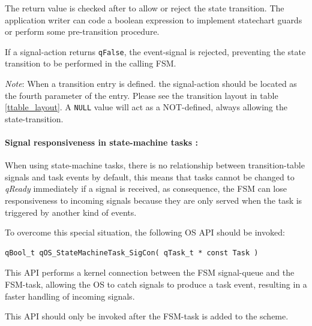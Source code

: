 \documentclass{article}
\begin{document}
\newline

The return value is checked after to allow or reject the state transition. The application writer can code a boolean expression to implement statechart guards or perform some pre-transition procedure.

\begin{tcolorbox}
\HandRight If a signal-action returns \lstinline{qFalse}, the event-signal is rejected, preventing the state transition to be performed in the calling FSM.
\end{tcolorbox}

\begin{tcolorbox}
\ArrowBoldDownRight \textit{Note}: When a transition entry is defined. the signal-action should be located as the fourth parameter of the entry. Please see the transition layout in table \ref{ttable_layout}.
A \lstinline{NULL} value will act as a NOT-defined, always allowing the state-transition. 
\end{tcolorbox}

\paragraph{Signal responsiveness in state-machine tasks :}

When using state-machine tasks, there is no relationship between transition-table signals and task events by default, this means that tasks cannot be changed to \textit{qReady} immediately if a signal is received, as consequence, the FSM can lose responsiveness to incoming signals because they are only served when the task is triggered by another kind of events. 

To overcome this special situation, the following OS API should be invoked: \\

\begin{lstlisting}[style=CStyle]
qBool_t qOS_StateMachineTask_SigCon( qTask_t * const Task )
\end{lstlisting} 

This API performs a kernel connection between the FSM signal-queue and the FSM-task, allowing the OS to catch signals to produce a task event, resulting in a faster handling of incoming signals. \\

\begin{tcolorbox}
\HandRight This API should only be invoked after the FSM-task is added to the scheme.
\end{tcolorbox}
\end{document}
